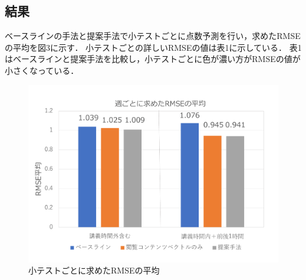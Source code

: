 \documentclass[platex,dvipdfmx,a4paper,twocolumn,base=10pt,jbase=10pt,ja=standard]{bxjsarticle}
\begin{document}

\subsection{結果}

ベースラインの手法と提案手法で小テストごとに点数予測を行い，求めたRMSEの平均を図3に示す．
小テストごとの詳しいRMSEの値は表1に示している．
表1はベースラインと提案手法を比較し，小テストごとに色が濃い方がRMSEの値が小さくなっている．



\begin{figure}[h]
  \centering
  \includegraphics[scale = 0.25]{RMSE.pdf}
  \caption{小テストごとに求めたRMSEの平均}
  \label{fig:小テストごとに求めたRMSEの平均}
\end{figure}
\end{document}
